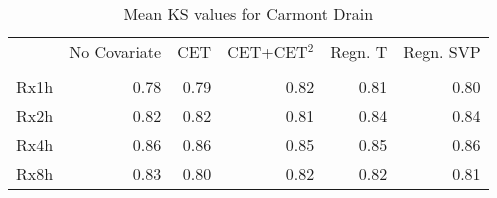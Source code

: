 \begin{table}
\caption{Mean KS values for Carmont Drain}
\label{tab:ks}
\begin{tabular}{lrrrrr}
\toprule
 & No Covariate & CET & CET+CET$^2$ & Regn. T & Regn. SVP \\
 &  &  &  &  &  \\
\midrule
Rx1h & 0.78 & 0.79 & 0.82 & 0.81 & 0.80 \\
Rx2h & 0.82 & 0.82 & 0.81 & 0.84 & 0.84 \\
Rx4h & 0.86 & 0.86 & 0.85 & 0.85 & 0.86 \\
Rx8h & 0.83 & 0.80 & 0.82 & 0.82 & 0.81 \\
\bottomrule
\end{tabular}
\end{table}
